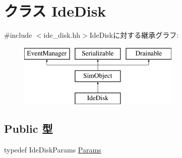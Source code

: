\hypertarget{classIdeDisk}{
\section{クラス IdeDisk}
\label{classIdeDisk}
}


{\ttfamily \#include $<$ide\_\-disk.hh$>$}IdeDiskに対する継承グラフ:\begin{figure}[H]
\begin{center}
\leavevmode
\includegraphics[height=3cm]{classIdeDisk}
\end{center}
\end{figure}
\subsection*{Public 型}
\begin{DoxyCompactItemize}
\item 
typedef IdeDiskParams \hyperlink{classIdeDisk_a21c0f7d16893ae472d7dbbc6df963053}{Params}
\end{DoxyCompactItemize}
